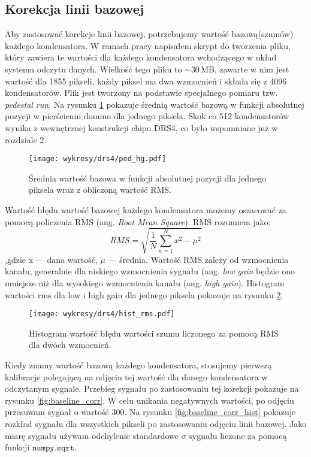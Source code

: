 \documentclass[a4paper,11pt,twoside]{article}
\begin{document}
\subsection{Korekcja linii bazowej}
Aby zastosować korekcje linii bazowej, potrzebujemy wartość bazową(szumów) każdego kondensatora. W ramach pracy napisałem skrypt do tworzenia pliku, który zawiera te wartości dla każdego kondensatora wchodzącego w układ systemu odczytu danych. Wielkość tego pliku to $\sim 30$\,MB, zawarte w nim jest wartość dla 1855 pikseli, każdy piksel ma dwa wzmocnień i składa się z 4096 kondensatorów. Plik jest tworzony na podstawie specjalnego pomiaru tzw. \textsl{pedestal run}. Na rysunku \ref{fig:ped_4096} pokazuje średnią wartość bazową w funkcji absolutnej pozycji w pierścieniu domino dla jednego piksela. Skok co 512 kondensatorów wynika z wewnętrznej konstrukcji chipu DRS4, co było wspomniane już w rozdziale 2.
\begin{figure}[H] 
\centering
\texttt{[image: wykresy/drs4/ped\_hg.pdf]}
\caption{Średnia wartość bazowa w funkcji absolutnej pozycji dla jednego piksela wraz z obliczoną wartość RMS.}
\label{fig:ped_4096}
\end{figure}
Wartość błędu wartość bazowej każdego kondensatora możemy oszacować za pomocą policzenia RMS (ang. \textsl{Root Mean Square}). RMS rozumiem jako:
\begin{equation}
RMS = \sqrt{ \frac{1}{N} \sum_{n=1}^{N} x^2 - \mu^2}
\end{equation}
,gdzie x --- dana wartość, $\mu$ --- średnia.
Wartość RMS zależy od wzmocnienia kanału, generalnie dla niskiego wzmocnienia sygnału (ang. \textsl{low gain} będzie ono mniejsze niż dla wysokiego wzmocnienia kanału (ang. \textsl{high gain}). Histogram wartości rms dla low i high gain dla jednego piksela pokazuje na rysunku \ref{fig:hist_rms}.
\begin{figure}[H] 
\centering
\texttt{[image: wykresy/drs4/hist\_rms.pdf]}
\caption{Histogram wartość błędu wartości szumu liczonego za pomocą RMS dla dwóch wzmocnień.}
\label{fig:hist_rms}
\end{figure}
\newpage
Kiedy znamy wartość bazową każdego kondensatora, stosujemy pierwszą kalibracje polegającą na odjęciu tej wartość dla danego kondensatora w odczytanym sygnale. Przebieg sygnału po zastosowaniu tej korekcji pokazuje na rysunku \ref{fig:baseline_corr}. W celu unikania negatywnych wartości, po odjęciu przesuwam sygnał o wartość 300. Na rysunku \ref{fig:baseline_corr_hist} pokazuje rozkład sygnału dla wszystkich pikseli po zastosowaniu odjęciu linii bazowej. Jako miarę sygnału używam odchylenie standardowe $\sigma$ sygnału liczone za pomocą funkcji $\mathtt{numpy.sqrt}$.
\end{document}
